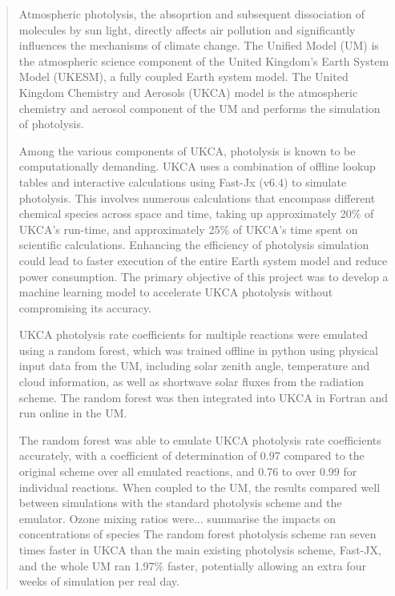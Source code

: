 \documentclass[journal abbreviation, manuscript]{copernicus}
\begin{document}
\begin{abstract}

Atmospheric photolysis, the absoprtion and subsequent dissociation of molecules by sun light, directly affects air pollution and significantly influences the mechanisms of climate change.
The Unified Model (UM) is the atmospheric science component of the United Kingdom's Earth System Model (UKESM), a fully coupled Earth system model. The United Kingdom Chemistry and Aerosols (UKCA) model is the atmospheric chemistry and aerosol component of the UM and performs the simulation of photolysis.

Among the various components of UKCA, photolysis is known to be computationally demanding. UKCA uses a combination of offline lookup tables and interactive calculations using Fast-Jx (v6.4) to simulate photolysis. This involves numerous calculations that encompass different chemical species across space and time, taking up approximately 20\% of UKCA's run-time, and approximately 25\% of UKCA's time spent on scientific calculations. Enhancing the efficiency of photolysis simulation could lead to faster execution of the entire Earth system model and reduce power consumption. 
The primary objective of this project was to develop a machine learning model to accelerate UKCA photolysis without compromising its accuracy.

UKCA photolysis rate coefficients for multiple reactions were emulated using a random forest, which was trained offline in python using physical input data from the UM, including solar zenith angle, temperature and cloud information, as well as shortwave solar fluxes from the radiation scheme. The random forest was then integrated into UKCA in Fortran and run online in the UM. 

The random forest was able to emulate UKCA photolysis rate coefficients accurately, with a coefficient of determination of 0.97 compared to the original scheme over all emulated reactions, and 0.76 to over 0.99 for individual reactions. When coupled to the UM, the results compared well between simulations with the standard photolysis scheme and the emulator. Ozone mixing ratios were... {summarise the impacts on concentrations of species} 
The random forest photolysis scheme ran seven times faster in UKCA than the main existing photolysis scheme, Fast-JX, and the whole UM ran 1.97\% faster, potentially allowing an extra four weeks of simulation per real day.

\end{abstract}
\end{document}
